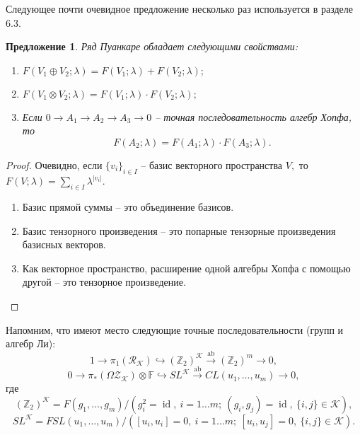 \documentclass[10pt,a4paper]{article}
\DeclareMathOperator{\id}{id}
\DeclareMathOperator{\ab}{ab}
\def\ZZ{\mathbb{Z}}
\def\FF{\mathbb{F}}
\def\R{\mathcal{R}}
\def\Z{\mathcal{Z}}
\def\K{\mathcal{K}}
\def\ZK{\Z_\K}
\def\RK{\R_\K}
\def\OZK{\Omega\ZK}
\newtheorem{prp}[thm]{Предложение}
\theoremstyle{definition}
\begin{document}
Следующее почти очевидное предложение несколько раз используется в разделе 6.3.
\begin{prp}
Ряд Пуанкаре обладает следующими свойствами:
\begin{enumerate}
\item $F(V_1\oplus V_2;\lambda)=F(V_1;\lambda)+F(V_2;\lambda);$
\item $F(V_1\otimes V_2;\lambda)=F(V_1;\lambda)\cdot F(V_2;\lambda);$
\item Если $0\to A_1\to A_2\to A_3\to 0$ -- точная последовательность алгебр Хопфа, то $$F(A_2;\lambda)=F(A_1;\lambda)\cdot F(A_3;\lambda).$$
\end{enumerate}
\end{prp}
\begin{proof}
Очевидно, если $\{v_i\}_{i\in I}$ -- базис векторного пространства $V,$ то $F(V;\lambda)=\sum_{i\in I}\lambda^{|v_i|}.$
\begin{enumerate}
\item Базис прямой суммы -- это объединение базисов.
\item Базис тензорного произведения -- это попарные тензорные произведения базисных векторов.
\item Как векторное пространство, расширение одной алгебры Хопфа с помощью другой -- это тензорное произведение.
\end{enumerate}
\end{proof}


Напомним, что имеют место следующие точные последовательности (групп и алгебр Ли):
$$1\to \pi_1(\RK)\hookrightarrow (\ZZ_2)^\K \overset{\ab}{\longrightarrow} (\ZZ_2)^m\to 0,$$
$$0\to \pi_*(\OZK)\otimes\FF\hookrightarrow SL^\K \overset{\ab}{\longrightarrow} CL(u_1,\dots,u_m)\to 0,$$
где
$$(\ZZ_2)^\K=F(g_1,\dots,g_m)/\left(g_i^2=\id,~i=1\dots m;~(g_i,g_j)=\id,~\{i,j\}\in\K\right),$$
$$SL^\K=FSL(u_1,\dots,u_m)/\left([u_i,u_i]=0,~i=1\dots m;~[u_i,u_j]=0,~\{i,j\}\in \K\right).$$
\end{document}
